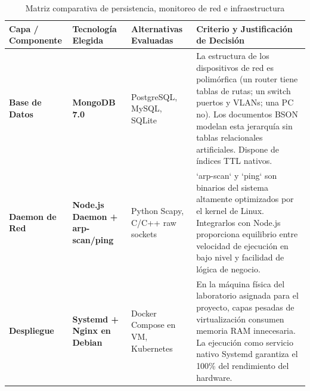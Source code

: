\documentclass[12pt,a4paper]{report}
\begin{document}
\begin{table}[htbp]
\centering
\caption{Matriz comparativa de persistencia, monitoreo de red e infraestructura}\label{tab:comparativa_infra}
\small
\begin{tabularx}{\textwidth}{p{2.6cm} p{2.8cm} p{3.8cm} X}
\toprule
\textbf{Capa / Componente} & \textbf{Tecnología Elegida} & \textbf{Alternativas Evaluadas} & \textbf{Criterio y Justificación de Decisión} \\
\midrule
\textbf{Base de Datos} & \textbf{MongoDB 7.0} & PostgreSQL, MySQL, SQLite & La estructura de los dispositivos de red es polimórfica (un router tiene tablas de rutas; un switch puertos y VLANs; una PC no). Los documentos BSON modelan esta jerarquía sin tablas relacionales artificiales. Dispone de índices TTL nativos. \\
\midrule
\textbf{Daemon de Red} & \textbf{Node.js Daemon + arp-scan/ping} & Python Scapy, C/C++ raw sockets & `arp-scan` y `ping` son binarios del sistema altamente optimizados por el kernel de Linux. Integrarlos con Node.js proporciona equilibrio entre velocidad de ejecución en bajo nivel y facilidad de lógica de negocio. \\
\midrule
\textbf{Despliegue} & \textbf{Systemd + Nginx en Debian} & Docker Compose en VM, Kubernetes & En la máquina física del laboratorio asignada para el proyecto, capas pesadas de virtualización consumen memoria RAM innecesaria. La ejecución como servicio nativo Systemd garantiza el 100\% del rendimiento del hardware. \\
\bottomrule
\end{tabularx}
\end{table}
\end{document}
